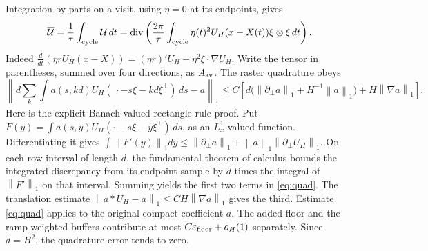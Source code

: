 \documentclass[11pt]{article}
\theoremstyle{remark}\newtheorem{remark}[theorem]{Remark}
\newcommand{\Div}{\operatorname{div}}
\newcommand{\norm}[2]{\left\|#1\right\|_{#2}}
\begin{document}
Integration by parts on a visit, using $\eta=0$ at its endpoints, gives
\begin{equation}\label{eq:average}
 \overline{\mathcal U}=\frac1\tau\int_{\rm cycle}\mathcal U\,dt
 =\Div\left(\frac{2\pi}{\tau}\int_{\rm cycle}
 \eta(t)^2U_H(x-X(t))\xi\otimes\xi\,dt\right).
\end{equation}
Indeed $\frac d{dt}(\eta rU_H(x-X))=(\eta r)'U_H-\eta^2\xi\cdot\nabla U_H$.
Write the tensor in parentheses, summed over four directions, as $A_{\rm av}$.
The raster quadrature obeys
\begin{equation}\label{eq:quad}
 \left\|d\sum_k\int a(s,kd)U_H(\,\cdot-s\xi-kd\xi^\perp)\,ds-a\right\|_1
 \leq C\left[d\bigl(\norm{\partial_\perp a}1+H^{-1}\norm a1\bigr)
 +H\norm{\nabla a}1\right].
\end{equation}
Here is the explicit Banach-valued rectangle-rule proof.
Put $F(y)=\int a(s,y)U_H(\cdot-s\xi-y\xi^\perp)\,ds$, as an $L^1_x$-valued
function.
Differentiating it gives
$\int\norm{F'(y)}1dy\leq\norm{\partial_\perp a}1+
\norm a1\norm{\partial_\perp U_H}1$.
On each row interval of length $d$, the fundamental theorem of calculus
bounds the integrated discrepancy from its endpoint sample by
$d$ times the integral of $\norm{F'}1$ on that interval.
Summing yields the first two terms in \eqref{eq:quad}.
The translation estimate
$\norm{a*U_H-a}1\leq CH\norm{\nabla a}1$ gives the third.
Estimate \eqref{eq:quad} applies to the original compact coefficient $a$.
The added floor and the ramp-weighted buffers contribute at most
$C\varepsilon_{\rm floor}+o_H(1)$ separately.
Since $d=H^2$, the quadrature error tends to zero.
\end{document}
